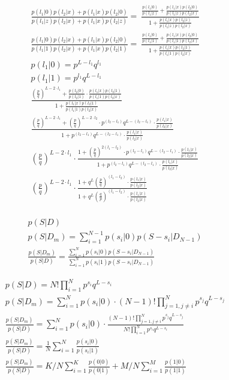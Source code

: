 \documentclass[11pt,draft]{article}
\begin{document}
\begin{align}
\frac{p(l_1|0)p(l_2|x) + p(l_1|x)p(l_2|0)}{p(l_1|z)p(l_2|x) + p(l_1|x)p(l_2|z)} = \
\frac{ \frac{p(l_1|0)}{p(l_1|z)} + \frac{p(l_1|x)p(l_2|0)}{p(l_1|z)p(l_2|x)}}{1 + \frac{p(l_1|x)p(l_2|z)}{p(l_1|z)p(l_2|x)}} \\
\frac{p(l_1|0)p(l_2|x) + p(l_1|x)p(l_2|0)}{p(l_1|1)p(l_2|x) + p(l_1|x)p(l_2|1)} = \
\frac{ \frac{p(l_1|0)}{p(l_1|1)} + \frac{p(l_1|x)p(l_2|0)}{p(l_1|1)p(l_2|x)}}{1 + \frac{p(l_1|x)p(l_2|1)}{p(l_1|1)p(l_2|x)}} \\
p(l_1|0) = p^{L-l_1}q^{l_1}\\
p(l_1|1) = p^{l_1}q^{L-l_1}\\
\frac{ \left ( \frac{p}{q} \right )^{L-2\cdot l_1}  +  \frac{p(l_2|0)}{p(l_2|1)} \cdot \frac{p(l_1|x)p(l_2|1)}{p(l_1|1)p(l_2|x)}  } { 1 + \frac{p(l_1|x)p(l_2|1)}{p(l_1|1)p(l_2|x)}} \\
\frac{ \left ( \frac{p}{q} \right )^{L-2\cdot l_1}  +   \left ( \frac{p}{q} \right )^{L-2\cdot l_2} \cdot p^{(l_2-l_1)}q^{L-(l_2-l_1)} \cdot\frac{p(l_1|x)}{p(l_2|x)}  } { 1 +  p^{(l_2-l_1)}q^{L-(l_2-l_1)} \cdot\frac{p(l_1|x)}{p(l_2|x)} } \\
\left ( \frac{p}{q} \right )^{L-2\cdot l_1} \cdot \frac{ 1 +   \left ( \frac{p}{q} \right )^{2(l_1-l_2)} \cdot p^{(l_2-l_1)}q^{L-(l_2-l_1)} \cdot\frac{p(l_1|x)}{p(l_2|x)}  } { 1 +  p^{(l_2-l_1)}q^{L-(l_2-l_1)} \cdot\frac{p(l_1|x)}{p(l_2|x)} } \\
\left ( \frac{p}{q} \right )^{L-2\cdot l_1} \cdot \frac{ 1 +   q^L \left ( \frac{p}{q} \right )^{(l_1-l_2)} \cdot\frac{p(l_1|x)}{p(l_2|x)}  } { 1 +  q^L  \left ( \frac{q}{p} \right )^{(l_1-l_2)}  \cdot\frac{p(l_1|x)}{p(l_2|x)} } \\
\end{align}

\begin{align}
p(S|D) \\
p(S|D_m) = \sum_{i=1}^{N-1}  p(s_i |0) p(S-s_i | D_{N-1}) \\
\frac{p(S|D_m)}{p(S|D)} = \frac{ \sum_{i=1}^{N}  p(s_i |0) p(S-s_i | D_{N-1})}{ \sum_{i=1}^{N}  p(s_i |1) p(S-s_i | D_{N-1})}
\end{align}

\begin{align}
p(S|D) = N! \prod_{i=1}^N p^{s_i}q^{L-s_i}\\
p(S|D_m) =  \sum_{i=1}^{N}  p(s_i |0) \cdot (N-1)!  \prod_{j=1, j \neq i}^N p^{s_j}q^{L-s_j} \\
\frac{p(S|D_m)}{p(S|D)} = \sum_{i=1}^{N}  p(s_i |0) \cdot \frac{  (N-1)!  \prod_{j=1, j \neq i}^N p^{s_j}q^{L-s_j} } { N! \prod_{i=1}^N p^{s_i}q^{L-s_i}}  \\
\frac{p(S|D_m)}{p(S|D)} = \frac{1}{N}  \sum_{i=1}^{N}  \frac{p(s_i |0)}{ p(s_i |1)} \\
\frac{p(S|D_m)}{p(S|D)} = K/N  \sum_{i=1}^{K}  \frac{p(0 |0)}{ p(0 |1)} +  M/N  \sum_{i=1}^{M}  \frac{p(1 |0)}{ p(1 |1)} 
\end{align}
\end{document}
